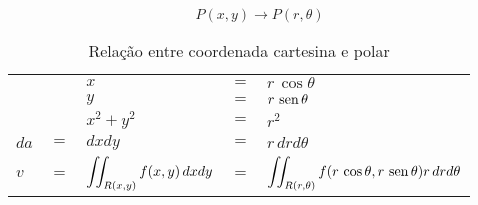 	$$P(x,y) \rightarrow P(r,\theta)$$
	
	\begin{table}[H]
		\caption{Relação entre coordenada cartesina e polar}
		\label{relacao_coordenada_cartesiana_polar}
		\centering		
		\begin{tabular}{|lclcl|}
			     &     & $x$                                 & $=$ & $r\,\cos \theta$                                                         \\
			     &     & $y$                                 & $=$ & $r\,\operatorname{sen} \theta$                                                         \\
			     &     & $x^2 + y^2$                         & $=$ & $r^2$                                                                    \\
			$da$ & $=$ & $dxdy$                              & $=$ & $r\,drd\theta$                                                           \\
			$v$  & $=$ & $\displaystyle\iint_{R(x,y)} f(x,y)\, dxdy$ & $=$ & $\displaystyle\iint_{R(r,\theta)} f(r\,\cos \theta,r\,\operatorname{sen} \theta) r\,drd\theta$
		\end{tabular}		
	\end{table}